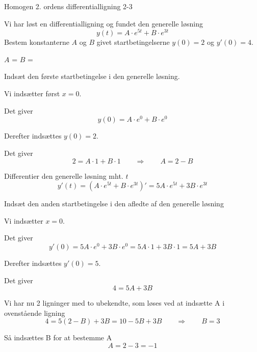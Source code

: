 \documentclass{article}
\begin{document}
\begin{exercise}{Homogen 2. ordens differentialligning 2-3}
	
	Vi har løst en differentialligning og fundet den generelle løsning
	\[
	y(t) = A \cdot e^{5t} + B \cdot e^{3t}
	\]
	Bestem konstanterne $A$ og $B$ givet startbetingelserne $y(0)=2$ og $y'(0)=4$.
	
	
	$A$ = 		
$B$ = 
	
	\hint
	
	Indsæt den første startbetingelse i den generelle løsning. 
	
	
	\hint
	
	Vi indsætter først $x=0$.
	
	\hint
	
	Det giver
	\[
	y(0)=  A \cdot e^{0} + B \cdot e^{0}
	\]
	
	\hint
	
	Derefter indsættes $y(0)=2$.
	
	\hint 
	
	Det giver 
	\[
	2= A \cdot 1 + B \cdot 1 \qquad \Rightarrow \qquad A = 2 - B
	\]
	
	\hint 
	
	Differentier den generelle løsning mht. $t$
	\[
	y'(t)= \left(A \cdot e^{5t} + B \cdot e^{3t} \right)' = 5A \cdot e^{5t} + 3B \cdot e^{3t} 
	\]
	
	\hint 
	
	Indsæt den anden startbetingelse i den afledte af den generelle løsning
	
	\hint
	
	Vi indsætter $x=0$.
	
	\hint 
	
	Det giver
	\[
	y'(0) = 5A \cdot e^{0} + 3B \cdot e^{0} =  5A \cdot 1 + 3B \cdot 1  = 5A + 3B
	\]
	
	\hint 
	
	Derefter indsættes $y'(0)=5$.	
	\hint
	
	Det giver
	\[
	4 = 5A+ 3B 
	\]
	
	\hint 
	
	Vi har nu 2 ligninger med to ubekendte, som løses ved at indsætte A i ovenstående ligning
	\[
	4 = 5(2-B) + 3B = 10 - 5B + 3B \qquad \Rightarrow \qquad B = 3
	\]
	
	\hint
	
	Så indsættes B for at bestemme A
	\[
	A = 2 - 3 = -1
	\]
	
\end{exercise}

\newpage
\end{document}
